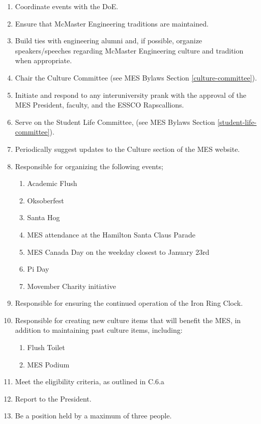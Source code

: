 \begin{enumerate}
 \item
  Coordinate events with the DoE.
 \item
  Ensure that McMaster Engineering traditions are maintained.
 \item
  Build ties with engineering alumni and, if possible, organize speakers/speeches regarding McMaster Engineering culture and tradition when appropriate.
 \item
  Chair the Culture Committee (see MES Bylaws Section \ref{culture-committee}).
 \item
  Initiate and respond to any interuniversity prank with the approval of the MES President, faculty, and the ESSCO Rapscallions.
 \item
  Serve on the Student Life Committee, (see MES Bylaws Section \ref{student-life-committee}).
 \item
  Periodically suggest updates to the Culture section of the MES website.
 \item
  Responsible for organizing the following events;

  \begin{enumerate}
   \item
    Academic Flush
   \item
    Oksoberfest
   \item
    Santa Hog
   \item
    MES attendance at the Hamilton Santa Claus Parade
   \item
    MES Canada Day on the weekday closest to January 23rd
   \item
    Pi Day
   \item
    Movember Charity initiative
  \end{enumerate}
 \item
  Responsible for ensuring the continued operation of the Iron Ring Clock.
 \item
  Responsible for creating new culture items that will benefit the MES, in addition to maintaining past culture items, including:

  \begin{enumerate}
   \item
    Flush Toilet
   \item
    MES Podium
  \end{enumerate}
 \item
  Meet the eligibility criteria, as outlined in C.6.a %
 \item
  Report to the President.
 \item
  Be a position held by a maximum of three people.

\end{enumerate}


